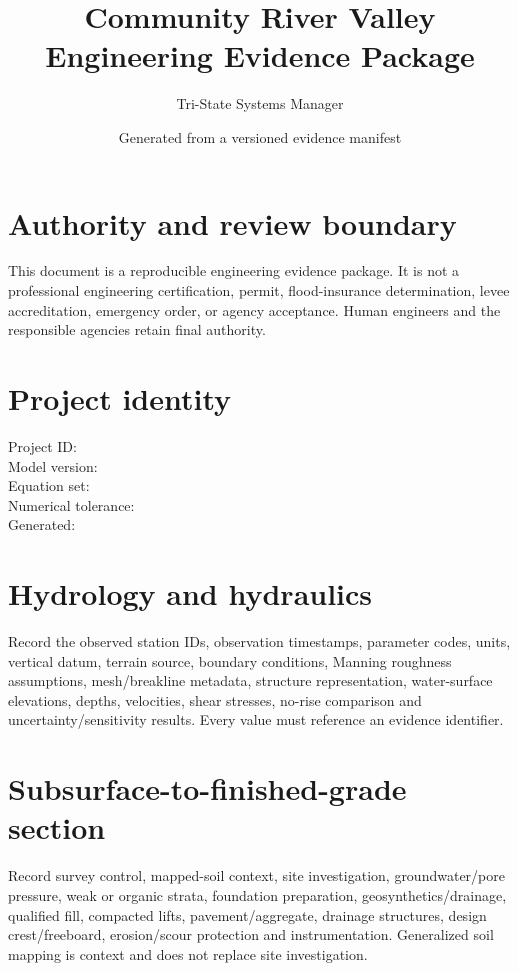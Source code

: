 \documentclass[11pt]{article}
\title{Community River Valley Engineering Evidence Package}
\author{Tri-State Systems Manager}
\date{Generated from a versioned evidence manifest}
\begin{document}
\maketitle

\section*{Authority and review boundary}
This document is a reproducible engineering evidence package. It is not a professional engineering certification, permit, flood-insurance determination, levee accreditation, emergency order, or agency acceptance. Human engineers and the responsible agencies retain final authority.

\section{Project identity}
Project ID: \texttt{}\\
Model version: \texttt{}\\
Equation set: \texttt{}\\
Numerical tolerance: \texttt{}\\
Generated: \texttt{}

\section{Hydrology and hydraulics}
Record the observed station IDs, observation timestamps, parameter codes, units, vertical datum, terrain source, boundary conditions, Manning roughness assumptions, mesh/breakline metadata, structure representation, water-surface elevations, depths, velocities, shear stresses, no-rise comparison and uncertainty/sensitivity results. Every value must reference an evidence identifier.

\section{Subsurface-to-finished-grade section}
Record survey control, mapped-soil context, site investigation, groundwater/pore pressure, weak or organic strata, foundation preparation, geosynthetics/drainage, qualified fill, compacted lifts, pavement/aggregate, drainage structures, design crest/freeboard, erosion/scour protection and instrumentation. Generalized soil mapping is context and does not replace site investigation.
\end{document}
